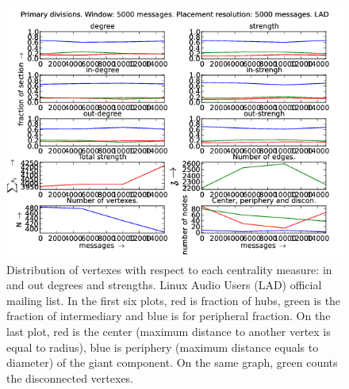 \documentclass[%
 aip,
 jmp,%
 amsmath,amssymb,
 reprint,%
]{revtex4-1}
\begin{document}
\begin{figure}[hbtp] 
   \centering
        \includegraphics[width=\textwidth]{figs/LAD/5000}
    \caption{Distribution of vertexes with respect to each centrality measure: in and out degrees and strengths. Linux Audio Users (LAD) official mailing list. In the first six plots, red is fraction of hubs, green is the fraction of intermediary and blue is for peripheral fraction. On the last plot, red is the center (maximum distance to another vertex is equal to radius), blue is periphery (maximum distance equals to diameter) of the giant component. On the same graph, green counts the disconnected vertexes.}
    \label{fig:lad5000}
\end{figure}
\end{document}
